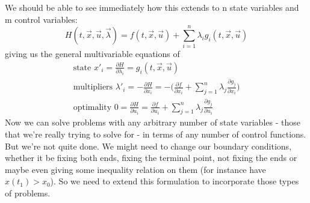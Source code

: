 \documentclass[11pt]{article}
\numberwithin{equation}{section}
\begin{document}
We should be able to see immediately how this extends to n state variables and m control variables:
\begin{equation}
H(t,\vec{x},\vec{u},\vec{\lambda}) = f(t,\vec{x},\vec{u}) + \sum_{i=1}^{n} \lambda_ig_i(t,\vec{x},\vec{u})
\end{equation}
giving us the general multivariable equations of
\begin{align}
\text{state } x'_i = \frac{\partial H}{\partial \lambda_i} = g_i(t,\vec{x},\vec{u}) \\
\text{multipliers } \lambda'_i = -\frac{\partial H}{\partial x_i} = -\big(\frac{\partial f}{\partial x_i} + \sum_{j=1}^{n} \lambda_j\frac{\partial g_j}{\partial x_i}\big) \\
\text{optimality } 0 = \frac{\partial H}{\partial u_i} = \frac{\partial f}{\partial u_i} + \sum_{j=1}^{n} \lambda_j\frac{\partial g_j}{\partial u_i}
\end{align}
Now we can solve problems with any arbitrary number of state variables - those that we're really trying to solve for - in terms of any number of control functions. But we're not quite done. We might need to change our boundary conditions, whether it be fixing both ends, fixing the terminal point, not fixing the ends or maybe even giving some inequality relation on them (for instance have $x(t_1) > x_0$). So we need to extend this formulation to incorporate those types of problems.
\end{document}
